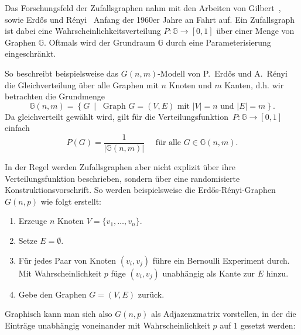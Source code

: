 Das Forschungsfeld der Zufallsgraphen nahm mit den Arbeiten von Gilbert~\cite{gilbert_1959}, sowie Erd\H{o}s und R\'enyi~\cite{erdos_renyi_1960} Anfang der 1960er Jahre an Fahrt auf.
Ein Zufallsgraph ist dabei eine Wahrscheinlichkeitsverteilung $P\colon \mathbb G \to [0, 1]$ über einer Menge von Graphen $\mathbb G$.
Oftmals wird der Grundraum $\mathbb G$ durch eine Parameterisierung eingeschränkt.

So  beschreibt beispielsweise das $G(n, m)$-Modell von P.~Erd\H{o}s und A.~R\'enyi die Gleichverteilung über alle Graphen mit $n$ Knoten und $m$ Kanten, d.h. wir betrachten die Grundmenge
\begin{equation}
    \mathbb G(n, m) = \left\{ G \  \middle| \  \text{ Graph } G=(V, E) \text{ mit } |V| = n \text{ und } |E| =m \right\}.
\end{equation}
Da gleichverteilt gewählt wird, gilt für die Verteilungsfunktion~{$P\colon \mathbb G \to [0,1]$} einfach
\begin{equation}
    P(G) = \frac{1}{| \mathbb G(n,m) |} \quad \text{ für alle } G \in \mathbb G(n, m).
\end{equation}

In der Regel werden Zufallsgraphen aber nicht explizit über ihre Verteilungsfunktion beschrieben, sondern über eine randomisierte Konstruktionsvorschrift.
So werden beispielsweise die  Erd\H{o}s-R\'enyi-Graphen $G(n, p)$ wie folgt erstellt:
\begin{enumerate}
    \item Erzeuge $n$ Knoten $V = \{v_1, \ldots, v_n\}$.
    \item Setze $E = \emptyset$.
    \item Für jedes Paar von Knoten $(v_i, v_j)$ führe ein Bernoulli Experiment durch.
          Mit Wahrscheinlichkeit $p$ füge $(v_i, v_j)$ unabhängig als Kante zur $E$ hinzu.
    \item Gebe den Graphen $G=(V, E)$ zurück.
\end{enumerate}

\noindent
Graphisch kann man sich also $G(n, p)$ als Adjazenzmatrix vorstellen, in der die Einträge unabhängig voneinander mit Wahrscheinlichkeit $p$ auf $1$ gesetzt werden:

